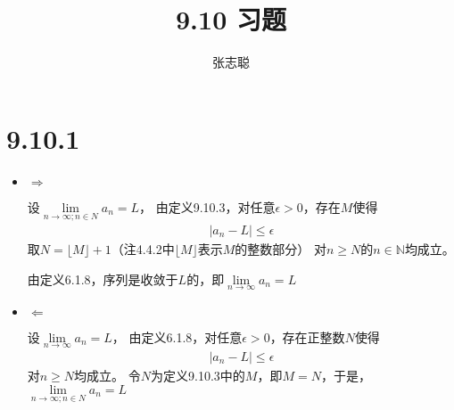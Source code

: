 \documentclass{article}
\begin{document}
\title{9.10 习题}
\author{张志聪}
\maketitle

\section*{9.10.1}

\begin{itemize}
  \item $\Rightarrow$

        设$\lim\limits_{n \rightarrow \infty; n \in N}a_n = L$，
        由定义9.10.3，对任意$\epsilon > 0$，存在$M$使得
        \begin{align*}
          |a_n - L| \leq \epsilon
        \end{align*}
        取$N = \lfloor M \rfloor + 1$（注4.4.2中$\lfloor M \rfloor$表示$M$的整数部分）
        对$n \geq N$的$n \in \mathbb{N}$均成立。

        由定义6.1.8，序列是收敛于$L$的，即$\lim\limits_{n \to \infty} a_n = L$

  \item $\Leftarrow$

        设$\lim\limits_{n \to \infty} a_n = L$，
        由定义6.1.8，对任意$\epsilon > 0$，存在正整数$N$使得
        \begin{align*}
          |a_n - L| \leq \epsilon
        \end{align*}
        对$n \geq N$均成立。
        令$N$为定义9.10.3中的$M$，即$M=N$，于是，$\lim\limits_{n \rightarrow \infty; n \in N}a_n = L$
\end{itemize}
\end{document}
